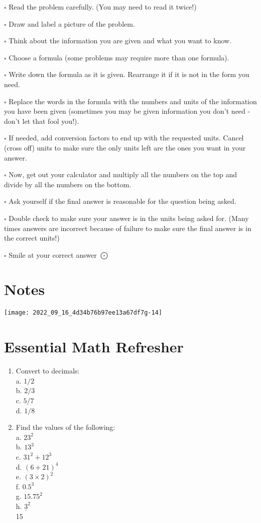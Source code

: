 \begin{enumerate}
$\square$ Read the problem carefully. (You may need to read it twice!)

$\square$ Draw and label a picture of the problem.

$\square$ Think about the information you are given and what you want to know.

$\square$ Choose a formula (some problems may require more than one formula).

$\square$ Write down the formula as it is given. Rearrange it if it is not in the form you need.

$\square$ Replace the words in the formula with the numbers and units of the information you have been given (sometimes you may be given information you don't need - don't let that fool you!).

$\square$ If needed, add conversion factors to end up with the requested units. Cancel (cross off) units to make sure the only units left are the ones you want in your answer.

$\square$ Now, get out your calculator and multiply all the numbers on the top and divide by all the numbers on the bottom.

$\square$ Ask yourself if the final answer is reasonable for the question being asked.

$\square$ Double check to make sure your answer is in the units being asked for. (Many times answers are incorrect because of failure to make sure the final answer is in the correct units!)

$\square$ Smile at your correct answer $\bigodot$

\section{Notes}
\texttt{[image: 2022\_09\_16\_4d34b76b97ee13a67df7g-14]}

\section{Essential Math Refresher}
\begin{enumerate}
  \item Convert to decimals:\\
a. $1 / 2$\\
b. $2 / 3$\\
c. $5 / 7$\\
d. $1 / 8$

  \item Find the values of the following:\\
a. $23^{2}$\\
b. $13^{3}$\\
c. $31^{2}+12^{3}$\\
d. $(6+21)^{4}$\\
e. $(3 \times 2)^{2}$\\
f. $0.5^{3}$\\
g. $15.75^{2}$\\
h. $\underline{3}^{2}$\\
15


\end{enumerate}
\end{enumerate}
